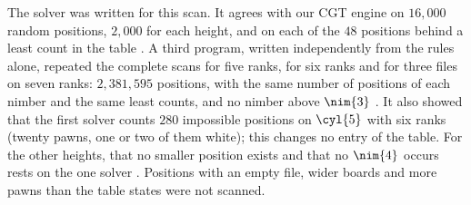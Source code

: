 The solver was written for this scan. It agrees with our CGT engine on $16{,}000$ random positions, $2{,}000$ for
each height, and on each of the $48$ positions behind a least count in the table . A third program,
written independently from the rules alone, repeated the complete scans for five ranks, for six ranks and for three
files on seven ranks: $2{,}381{,}595$ positions, with the same number of positions of each nimber and the same least
counts, and no nimber above $\nim{3}$ . It also showed that the first solver counts $280$ impossible
positions on $\cyl{5}$ with six ranks (twenty pawns, one or two of them white); this changes no entry of the table.
For the other heights, that no smaller position exists and that no $\nim{4}$ occurs rests on the one solver
. Positions with an empty file, wider boards and more pawns than the table states were not scanned.
